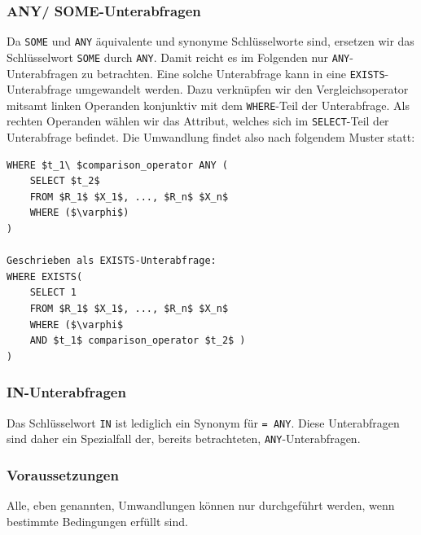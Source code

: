 \subsubsection*{ANY/ SOME-Unterabfragen}

Da \verb|SOME| und \verb|ANY| äquivalente und synonyme Schlüsselworte sind, ersetzen wir das Schlüsselwort \verb|SOME| durch \verb|ANY|. Damit reicht es im Folgenden nur \verb|ANY|-Unterabfragen zu betrachten. Eine solche Unterabfrage kann in eine \verb|EXISTS|-Unterabfrage umgewandelt werden. Dazu verknüpfen wir den Vergleichsoperator mitsamt linken Operanden konjunktiv mit dem \verb|WHERE|-Teil der Unterabfrage. Als rechten Operanden wählen wir das Attribut, welches sich im \verb|SELECT|-Teil der Unterabfrage befindet. Die Umwandlung findet also nach folgendem Muster statt:

\begin{lstlisting}[mathescape]
WHERE $t_1\ $comparison_operator ANY (
	SELECT $t_2$
	FROM $R_1$ $X_1$, ..., $R_n$ $X_n$
	WHERE ($\varphi$) 
) 

Geschrieben als EXISTS-Unterabfrage:
WHERE EXISTS( 
	SELECT 1
	FROM $R_1$ $X_1$, ..., $R_n$ $X_n$
	WHERE ($\varphi$ 
	AND $t_1$ comparison_operator $t_2$ )
)
\end{lstlisting}

\subsubsection*{IN-Unterabfragen}

Das Schlüsselwort \verb|IN| ist lediglich ein Synonym für \verb|= ANY|. Diese Unterabfragen sind daher ein Spezialfall der, bereits betrachteten, \verb|ANY|-Unterabfragen.

\subsubsection*{Voraussetzungen}

Alle, eben genannten, Umwandlungen können nur durchgeführt werden, wenn bestimmte Bedingungen erfüllt sind.

